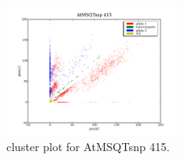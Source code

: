 \begin{figure}[H]
\includegraphics[width=0.5\textwidth]{figures/cluster_plot_AtMSQTsnp_415.png}
\caption{cluster plot for AtMSQTsnp 415.} \label{flAtMSQTsnp415}
\end{figure}

